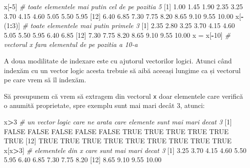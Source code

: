 \documentclass[]{article}
\newenvironment{Shaded}{\begin{snugshade}}{\end{snugshade}}
\newcommand{\CommentTok}[1]{\textcolor[rgb]{0.56,0.35,0.01}{\textit{#1}}}
\newcommand{\DecValTok}[1]{\textcolor[rgb]{0.00,0.00,0.81}{#1}}
\newcommand{\FloatTok}[1]{\textcolor[rgb]{0.00,0.00,0.81}{#1}}
\newcommand{\NormalTok}[1]{#1}
\newcommand{\OperatorTok}[1]{\textcolor[rgb]{0.81,0.36,0.00}{\textbf{#1}}}
\newcommand{\OtherTok}[1]{\textcolor[rgb]{0.56,0.35,0.01}{#1}}
\newcommand{\StringTok}[1]{\textcolor[rgb]{0.31,0.60,0.02}{#1}}
\begin{document}
\begin{Shaded}
\begin{Highlighting}[]
\NormalTok{x[}\OperatorTok{-}\DecValTok{5}\NormalTok{] }\CommentTok{# toate elementele mai putin cel de pe pozitia 5 }
\NormalTok{ [}\DecValTok{1}\NormalTok{]  }\FloatTok{1.00}  \FloatTok{1.45}  \FloatTok{1.90}  \FloatTok{2.35}  \FloatTok{3.25}  \FloatTok{3.70}  \FloatTok{4.15}  \FloatTok{4.60}  \FloatTok{5.05}  \FloatTok{5.50}  \FloatTok{5.95}
\NormalTok{[}\DecValTok{12}\NormalTok{]  }\FloatTok{6.40}  \FloatTok{6.85}  \FloatTok{7.30}  \FloatTok{7.75}  \FloatTok{8.20}  \FloatTok{8.65}  \FloatTok{9.10}  \FloatTok{9.55} \FloatTok{10.00}
\NormalTok{x[}\OperatorTok{-}\NormalTok{(}\DecValTok{1}\OperatorTok{:}\DecValTok{3}\NormalTok{)] }\CommentTok{# toate elementele mai putin primele 3}
\NormalTok{ [}\DecValTok{1}\NormalTok{]  }\FloatTok{2.35}  \FloatTok{2.80}  \FloatTok{3.25}  \FloatTok{3.70}  \FloatTok{4.15}  \FloatTok{4.60}  \FloatTok{5.05}  \FloatTok{5.50}  \FloatTok{5.95}  \FloatTok{6.40}  \FloatTok{6.85}
\NormalTok{[}\DecValTok{12}\NormalTok{]  }\FloatTok{7.30}  \FloatTok{7.75}  \FloatTok{8.20}  \FloatTok{8.65}  \FloatTok{9.10}  \FloatTok{9.55} \FloatTok{10.00}
\NormalTok{x =}\StringTok{ }\NormalTok{x[}\OperatorTok{-}\DecValTok{10}\NormalTok{] }\CommentTok{# vectorul x fara elementul de pe pozitia a 10-a}
\end{Highlighting}
\end{Shaded}

A doua modilitate de indexare este cu ajutorul vectorilor logici. Atunci
când indexăm cu un vector logic acesta trebuie să aibă aceeași lungime
ca și vectorul pe care vrem să îl indexăm.

Să presupunem că vrem să extragem din vectorul \texttt{x} doar
elementele care verifică o anumită proprietate, spre exemplu sunt mai
mari decât 3, atunci:

\begin{Shaded}
\begin{Highlighting}[]
\NormalTok{x}\OperatorTok{>}\DecValTok{3} \CommentTok{# un vector logic care ne arata care elemente sunt mai mari decat 3}
\NormalTok{ [}\DecValTok{1}\NormalTok{] }\OtherTok{FALSE} \OtherTok{FALSE} \OtherTok{FALSE} \OtherTok{FALSE} \OtherTok{FALSE}  \OtherTok{TRUE}  \OtherTok{TRUE}  \OtherTok{TRUE}  \OtherTok{TRUE}  \OtherTok{TRUE}  \OtherTok{TRUE}
\NormalTok{[}\DecValTok{12}\NormalTok{]  }\OtherTok{TRUE}  \OtherTok{TRUE}  \OtherTok{TRUE}  \OtherTok{TRUE}  \OtherTok{TRUE}  \OtherTok{TRUE}  \OtherTok{TRUE}  \OtherTok{TRUE}  \OtherTok{TRUE}
\NormalTok{x[x}\OperatorTok{>}\DecValTok{3}\NormalTok{] }\CommentTok{# elementele din x care sunt mai mari decat 3}
\NormalTok{ [}\DecValTok{1}\NormalTok{]  }\FloatTok{3.25}  \FloatTok{3.70}  \FloatTok{4.15}  \FloatTok{4.60}  \FloatTok{5.50}  \FloatTok{5.95}  \FloatTok{6.40}  \FloatTok{6.85}  \FloatTok{7.30}  \FloatTok{7.75}  \FloatTok{8.20}
\NormalTok{[}\DecValTok{12}\NormalTok{]  }\FloatTok{8.65}  \FloatTok{9.10}  \FloatTok{9.55} \FloatTok{10.00}
\end{Highlighting}
\end{Shaded}
\end{document}
